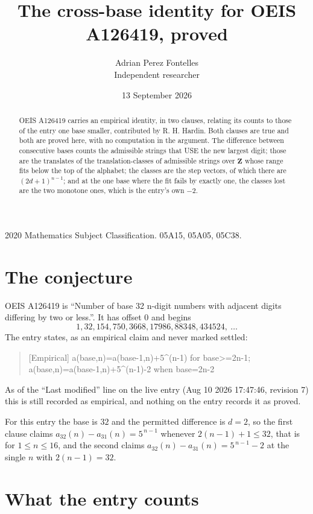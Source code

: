 \documentclass[11pt,a4paper]{article}
\title{The cross-base identity for OEIS A126419, proved}
\author{Adrian Perez Fontelles\\ \small Independent researcher}
\date{13 September 2026}
\theoremstyle{plain}
\theoremstyle{definition}
\begin{document}
\maketitle

\begin{abstract}
OEIS A126419 carries an empirical identity, in two clauses, relating its counts to those of the
entry one base smaller, contributed by R. H. Hardin. Both clauses are true and both are proved
here, with no computation in the argument. The difference between consecutive bases counts the
admissible strings that USE the new largest digit; those are the translates of the
translation-classes of admissible strings over $\mathbf{Z}$ whose range fits below the top of
the alphabet; the classes are the step vectors, of which there are $(2d+1)^{n-1}$; and at the
one base where the fit fails by exactly one, the classes lost are the two monotone ones, which
is the entry's own $-2$.
\end{abstract}

\noindent\small 2020 Mathematics Subject Classification. 05A15, 05A05, 05C38.\normalsize

\section{The conjecture}

OEIS A126419 is ``Number of base 32 n-digit numbers with adjacent digits differing by two or less.''. It has offset $0$ and begins
\[
1, 32, 154, 750, 3668, 17986, 88348, 434524,\ \dots
\]
The entry states, as an empirical claim and never marked settled:
\begin{quote}
[Empirical] a(base,n)=a(base-1,n)+5\textasciicircum{}(n-1) for base>=2n-1; a(base,n)=a(base-1,n)+5\textasciicircum{}(n-1)-2 when base=2n-2
\end{quote}
As of the ``Last modified'' line on the live entry (Aug 10 2026 17:47:46, revision 7)
this is still recorded as empirical, and nothing on the entry records it as proved.

For this entry the base is $32$ and the permitted difference is $d=2$, so the first clause
claims $a_{32}(n)-a_{31}(n)=5^{\,n-1}$ whenever $2(n-1)+1\le32$, that is for
$1\le n\le16$, and the second claims $a_{32}(n)-a_{31}(n)=5^{\,n-1}-2$ at the single
$n$ with $2(n-1)=32$.

\section{What the entry counts}
\end{document}
